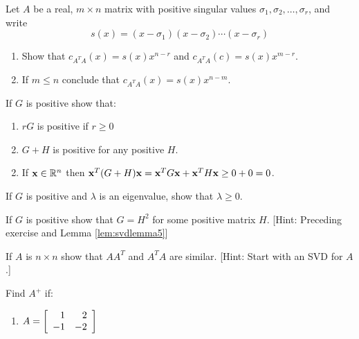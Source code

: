 \begin{multicols}{2}
\begin{ex}
Let $A$ be a real, $m\times n$ matrix with positive singular values $\sigma_{1},\sigma_{2},\dots ,\sigma_{r}$, and write 
\begin{equation*}
s(x)=(x-\sigma_{1})(x-\sigma_{2})\cdots (x-\sigma_{r})
\end{equation*}
\begin{enumerate}[label={\alph*.}]
\item Show that $c_{A^{T}A}(x)=s(x)x^{n-r}$ and \newline $c_{A^{T}A}(c)=s(x)x^{m-r}$.
\item If $m\leq n$ conclude that $c_{A^{T}A}(x)=s(x)x^{n-m}$.
\end{enumerate}
\end{ex}

\begin{ex}
If $G$ is positive show that: 
\begin{enumerate}[label={\alph*.}]
\item $rG$ is positive if $r\geq 0$
\item $G+H$ is positive for any positive $H$.
\end{enumerate}
\begin{sol}
\begin{enumerate}[label={\alph*.}]
\setcounter{enumi}{1}
\item If $\textbf{x}\in \mathbb{R}^{n}$ then $\textbf{x}^{T}(G+H)\textbf{x}=\textbf{x}^{T}G\textbf{x}+\textbf{x}^{T}H\textbf{x}\geq 0+0=0$.
\end{enumerate}
\end{sol}
\end{ex}

\begin{ex}
If $G$ is positive and $\lambda$ is an eigenvalue, show that $\lambda \geq 0$.
\end{ex}

\begin{ex}
If $G$ is positive show that $G=H^{2}$ for some positive matrix $H$. [Hint: Preceding exercise and Lemma \ref{lem:svdlemma5}] 
\end{ex}

\begin{ex}
If $A$ is $n\times n$ show that $AA^{T}$ and $A^{T}A$ are similar. [Hint: Start with an SVD for $A$.]
\end{ex} 

\begin{ex}
Find $A^{+}$ if: 
\begin{enumerate}[label={\alph*.}]
\item
 $A=
\left[ 
\begin{array}{rr}
1 & 2 \\ 
-1 & -2
\end{array}
\right]$


\end{enumerate}
\end{ex}
\end{multicols}
